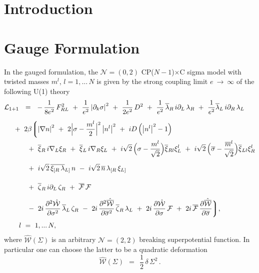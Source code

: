 \documentclass[12pt]{article}
\newcommand{\ntwot}{${\mathcal N}= \left(2,2\right) $ }
\newcommand{\ntwoo}{${\mathcal N}= \left(0,2\right) $ }
\newcommand{\p}{\partial}
\newcommand{\ov}{\overline}
\newcommand{\mc}[1]{\mathcal{#1}}
\newcommand{\bxir}{\ov{\xi}{}_R}
\newcommand{\bxil}{\ov{\xi}{}_L}
\newcommand{\xir}{\xi_R}
\newcommand{\xil}{\xi_L}
\newcommand{\bzr}{\ov{\zeta}{}_R}
\newcommand{\zr}{\zeta_R}
\newcommand{\nbar}{\ov{n}}
\newcommand{\CPC}{CP($N-1$)$\times$C }
\newcommand{\lar}{\lambda_R}
\newcommand{\lal}{\lambda_L}
\newcommand{\blar}{\ov{\lambda}{}_R}
\newcommand{\blal}{\ov{\lambda}{}_L}
\newcommand{\ff}{\mc{F}}
\newcommand{\bff}{\ov{\mc{F}}}
\begin{document}
%
%
\section{Introduction}

%
%
\section{Gauge Formulation}
\label{gaugef}

In the gauged formulation, the \ntwoo \CPC sigma model with twisted
masses $ m^l $, $ l = 1, ...\, N $ is given by the strong coupling limit $ e ~\to~ \infty $ of
the following U(1) theory
\begin{align}
\label{sigma_full}
% 
\notag
 	\mc{L}_\text{1+1} & ~~=~~
	-\,\frac{1}{8e^2}\,F_{RL}^2  ~+~ \frac{1}{e^2} \left|\p_k \sigma\right|^2 
	~+~ \frac{1}{2e^2}\, D^2
	~+~ \frac{1}{e^2}\, \blar\, i\p_L\, \lar  ~+~  \frac{1}{e^2} \blal\, i\p_R\, \lal
	\\[2mm]
%
\notag
	&
	\hspace{-0.4cm}
	~+~ 2\beta \biggl \lgroup
	\left| \nabla n \right|^2  ~+~ 2 \Bigl| \sigma - \frac{m^l}{2} \Bigr|^2 \left| n^l \right|^2
	~+~ iD \left( \left|n^l \right|^2 - 1 \right)
	\\
%
\notag
	&
	\hspace{-0.4cm}\phantom{2\beta\lgroup}
	~+~ \bxir\, i\nabla_L \xir  ~+~ \bxil\, i\nabla_R \xil ~+~
	i\sqrt{2}\, \Bigl( \sigma - \frac{m^l}{\sqrt{2}} \Bigr) \ov{\xi}{}_{Rl} \xi_L^l
	~+~ i\sqrt{2}\, \Bigl( \ov{\sigma} - \frac{\ov{m}{}^l}{\sqrt{2}} \Bigr) \ov{\xi}{}_{Ll} \xi_R^l
	\\[2mm]
%
	&
	\hspace{-0.4cm}\phantom{2\beta\lgroup}
	~+~ i\sqrt{2}\, \ov{\xi_{[R}\, \lambda}{}_{L]}\, n
	~-~ i\sqrt{2}\, \nbar\,  \lambda_{[R}\, \xi_{L]}
	\\[2mm]
%
\notag
	&
	\hspace{-0.4cm}\phantom{2\beta\lgroup}
	~+~ \bzr\, i\p_L\, \zr   ~+~   \bff\, \ff
	\\
%
\notag
	&
	\hspace{-0.4cm}\phantom{2\beta\lgroup}
	~-~ 2i\, \frac{\p^2 \hat{\mc{W}}}{\p \sigma^2}\, \blal\, \zr
	~-~ 2i\, \frac{\p^2 \hat{\ov{\mc{W}}}}{\p \ov{\sigma}{}^2}\, \bzr\, \lal
	~+~ 2i\, \frac{\p \hat{\mc{W}}}{\p \sigma}\, \ff
	~+~ 2i\, \bff\, \frac{\p \hat{\ov{\mc{W}}}}{\p \ov{\sigma}}
	\biggr\rgroup ,
	\\[1mm]
%
\notag
	&
	l~=~1,...\,N,
\end{align}
	where $ \hat{\mc{W}}(\Sigma) $ is an arbitrary \ntwot breaking superpotential function.
	In particular one can choose the latter to be a quadratic deformation
\[
	\hat{\mc{W}}(\Sigma) ~~=~~ \frac{1}{2}\, \delta\, \Sigma^2\,.
\]
\end{document}
